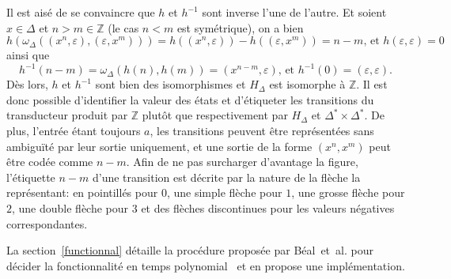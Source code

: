 	Il est aisé de se convaincre que $h$ et $h^{-1}$ sont inverse l'une de l'autre. Et soient $x \in \Delta$ et $n > m \in \mathbb{Z}$ (le cas $n < m$ est symétrique), on a bien 
	\begin{equation*}
		h(\omega_\Delta((x^n, \varepsilon),(\varepsilon, x^m))) = h((x^n, \varepsilon)) - h((\varepsilon, x^m)) = n-m \text{, et } h(\varepsilon,\varepsilon) = 0
	\end{equation*}
	ainsi que
	\begin{equation*}
	h^{-1}(n-m) = \omega_\Delta(h(n),h(m)) = (x^{n-m},\varepsilon) \text{, et } h^{-1}(0) = (\varepsilon,\varepsilon).
	\end{equation*}
	Dès lors, $h$ et $h^{-1}$ sont bien des isomorphismes et $H_\Delta$ est isomorphe à  $\mathbb{Z}$. Il est donc possible d'identifier la valeur des états et d'étiqueter les transitions du transducteur produit par $\mathbb{Z}$ plutôt que respectivement par $H_\Delta$ et $\Delta^* \times \Delta^*$. De plus, l'entrée étant toujours $a$, les transitions peuvent être représentées sans ambiguïté par leur sortie uniquement, et une sortie de la forme $(x^n,x^m)$ peut être codée comme $n-m$. Afin de ne pas surcharger d'avantage la figure, l'étiquette $n-m$ d'une transition est décrite par la nature de la flèche la représentant: en pointillés pour $0$, une simple flèche pour $1$, une grosse flèche pour $2$, une double flèche pour $3$ et des flèches discontinues pour les valeurs négatives correspondantes.
	
	La section~\ref{functionnal} détaille la procédure proposée par Béal~et~al. pour décider la fonctionnalité en temps polynomial~\cite{Bea03} et en propose une implémentation.
	
	